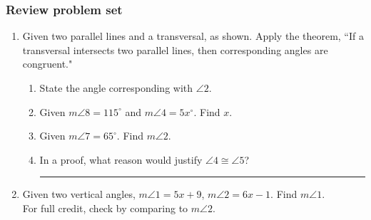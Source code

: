 \documentclass[12pt, oneside]{article}
\begin{document}
\subsubsection*{Review problem set}

  \begin{enumerate}

\item Given two parallel lines and a transversal, as shown. Apply the theorem, ``If a transversal intersects two parallel lines, then corresponding angles are congruent."
  \begin{center}
  \end{center}
  \begin{enumerate}
    \item State the angle corresponding with $\angle 2$. \vspace{1cm}
    \item Given $m\angle 8 = 115^\circ$ and $m\angle 4 = 5x^\circ$. Find $x$. \vspace{2cm}
    \item Given $m\angle 7 = 65^\circ$. Find $m\angle 2$. \vspace{2cm}
    \item In a proof, what reason would justify $\angle 4 \cong \angle 5$? \rule{6cm}{0.15mm}
  \end{enumerate}

  \item Given two vertical angles, $m \angle 1 = 5x+9$, $m \angle 2 = 6x-1$. Find $m \angle 1$.\\
  For full credit, check by comparing to $m\angle 2$.
      \begin{flushright}
      \end{flushright}


\end{enumerate}
\end{document}
